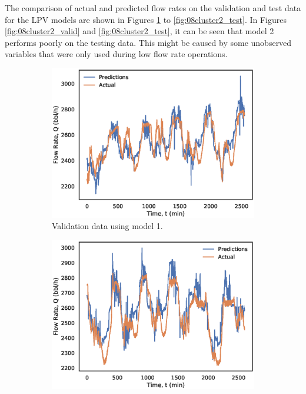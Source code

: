 The comparison of actual and predicted flow rates on the validation and test data for the LPV models are shown in Figures \ref{fig:08cluster1_valid} to \ref{fig:08cluster2_test}. In Figures \ref{fig:08cluster2_valid} and \ref{fig:08cluster2_test}, it can be seen that model 2 performs poorly on the testing data.  This might be caused by some unobserved variables that were only used during low flow rate operations.
\begin{figure}[h]
    \centering
     \begin{subfigure}[b]{0.48\textwidth}
         \includegraphics[width=\textwidth]{images/suncor/08cluster1_valid.eps}
         \caption{Validation data using model 1.}
         \label{fig:08cluster1_valid}
     \end{subfigure}
     \begin{subfigure}[b]{0.48\textwidth}
         \includegraphics[width=\textwidth]{images/suncor/08cluster1_test.eps}

\end{subfigure}
\end{figure}
